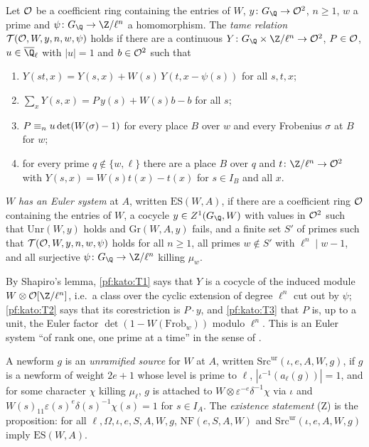 \begin{definition}\label{pf:kato:def:es}
Let $\mathcal{O}$ be a coefficient ring containing the entries of $W$, $y\colon G_\Q\to\katoO^2$, $n\ge1$, $w$ a prime
and $\psi\colon G_\Q\to\Z/\ell^n$ a homomorphism. The \emph{tame relation} $\mathcal{T}(\mathcal{O},W,y,n,w,\psi)$ holds if
there are a continuous
$Y\colon G_\Q\times\Z/\ell^n\to\katoO^2$, $P\in\mathcal{O}$, $u\in\katoQlb$ with $|u|=1$ and $b\in\mathcal{O}^2$ such that
\begin{enumerate}[label=(T\arabic*)]
\item\label{pf:kato:T1} $Y(st,x)=Y(s,x)+W(s)\,Y(t,x-\psi(s))$ for all $s,t,x$;
\item\label{pf:kato:T2} $\sum_{x}Y(s,x)=P\,y(s)+W(s)b-b$ for all $s$;
\item\label{pf:kato:T3} $P\equiv_{n}u\det(W(\sigma)-1)$ for every place $B$ over $w$ and every Frobenius $\sigma$ at $B$
  for $w$;
\item\label{pf:kato:T4} for every prime $q\notin\{w,\ell\}$ there are a place $B$ over $q$ and $t\colon\Z/\ell^n\to\katoO^2$
  with $Y(s,x)=W(s)t(x)-t(x)$ for $s\in I_B$ and all $x$.
\end{enumerate}
$W$ \emph{has an Euler system} at $A$, written $\mathrm{ES}(W,A)$, if there are a coefficient ring $\mathcal{O}$
containing the entries of $W$, a cocycle
$y\in\katoZ(G_\Q,W)$ with values in $\mathcal{O}^2$ such that $\mathrm{Unr}(W,y)$ holds and $\mathrm{Gr}(W,A,y)$ fails,
and a finite set $S'$ of primes such that $\mathcal{T}(\mathcal{O},W,y,n,w,\psi)$ holds for all $n\ge1$, all primes
$w\notin S'$ with $\ell^n\mid w-1$, and all surjective $\psi\colon G_\Q\to\Z/\ell^n$ killing $\mu_w$.
\end{definition}

By Shapiro's lemma, \ref{pf:kato:T1} says that $Y$ is a cocycle of the induced module
$W\otimes\katoO[\Z/\ell^n]$, i.e.\ a class over the cyclic extension of degree $\ell^n$ cut out by $\psi$; \ref{pf:kato:T2}
says that its corestriction is $P\cdot y$, and \ref{pf:kato:T3} that $P$ is, up to a unit, the Euler factor
$\det(1-W(\mathrm{Frob}_w))$ modulo $\ell^n$. This is an Euler system ``of rank one, one prime at a time'' in the
sense of \cite{Kolyvagin1990,Rubin2000}.

\begin{definition}\label{pf:kato:def:zetaur}
A newform $g$ is an \emph{unramified source} for $W$ at $A$, written $\mathrm{Src}^{\mathrm{ur}}(\iota,e,A,W,g)$, if $g$
is a newform of weight $2e+1$ whose level is prime to $\ell$,
$|\iota^{-1}(a_\ell(g))|=1$, and for some character $\chi$ killing $\mu_\ell$, $g$ is attached to
$W\otimes\varepsilon^{-e}\delta^{-1}\chi$ via $\iota$ and $W(s)_{11}\varepsilon(s)^e\delta(s)^{-1}\chi(s)=1$ for $s\in I_A$.
The \emph{existence statement} \textup{(Z)} is the proposition: for all $\ell,\Omega,\iota,e,S,A,W,g$, $\mathrm{NF}(e,S,A,W)$ and
$\mathrm{Src}^{\mathrm{ur}}(\iota,e,A,W,g)$ imply $\mathrm{ES}(W,A)$.
\end{definition}

